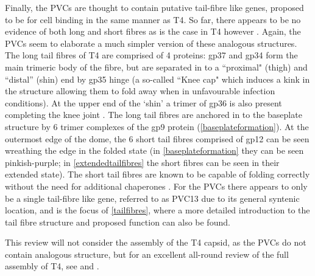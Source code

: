 Finally, the PVCs are thought to contain putative tail-fibre like genes, proposed to be for cell binding in the same manner as T4. So far, there appears to be no evidence of both long and short fibres as is the case in T4 however \citep{Bartual2010, Thomassen2003}. Again, the PVCs seem to elaborate a much simpler version of these analogous structures. The long tail fibres of T4 are comprised of 4 proteins: gp37 and gp34 form the main trimeric body of the fibre, but are separated in to a ``proximal" (thigh) and ``distal'' (shin) end by gp35 hinge (a so-called ``Knee cap" which induces a kink in the structure allowing them to fold away when in unfavourable infection conditions). At the upper end of the `shin' a trimer of gp36 is also present completing the knee joint \citep{Leiman2010}. The long tail fibres are anchored in to the baseplate structure by 6 trimer complexes of the gp9 protein (\vref{baseplateformation}). At the outermost edge of the dome, the 6 short tail fibres comprised of gp12 can be seen wreathing the edge in the folded state (in \vref{baseplateformation} they can be seen pinkish-purple; in \vref{extendedtailfibres} the short fibres can be seen in their extended state). The short tail fibres are known to be capable of folding correctly without the need for additional chaperones \citep{Leiman2010, Goldberg1997, Ali2003}. For the PVCs there appears to only be a single tail-fibre like gene, referred to as PVC13 due to its general syntenic location, and is the focus of \vref{tailfibres}, where a more detailed introduction to the tail fibre structure and proposed function can also be found. 

This review will not consider the assembly of the T4 capsid, as the PVCs do not contain analogous structure, but for an excellent all-round review of the full assembly of T4, see \cite{Yap2014a} and \cite{Leiman2010}.


